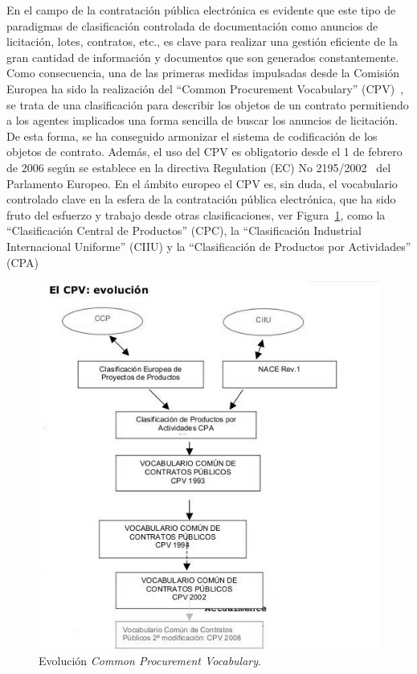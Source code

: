 En el campo de la contratación pública electrónica es evidente que este tipo
de paradigmas de clasificación controlada de documentación como anuncios de licitación, lotes,
contratos, etc., es clave para realizar una gestión eficiente de la gran cantidad de información
y documentos que son generados constantemente. Como consecuencia, una de las primeras medidas
impulsadas desde la Comisión Europea ha sido la realización del ``Common Procurement Vocabulary'' (\gls{CPV})~\cite{cpvguide}, se trata de 
una clasificación para describir los objetos de un contrato permitiendo a los agentes
implicados una forma sencilla de buscar los anuncios de licitación. De esta forma, se ha
conseguido armonizar el sistema de codificación de los objetos de contrato. Además, el uso
del CPV es obligatorio desde el 1 de febrero de 2006 según se establece en la directiva 
Regulation (EC) No 2195/2002~\cite{r2195} del Parlamento Europeo. En el ámbito europeo el CPV es, sin duda, 
el vocabulario controlado clave en la esfera de la contratación pública electrónica, que
ha sido fruto del esfuerzo y trabajo desde otras clasificaciones, ver Figura~\ref{fig:evo-cpv}, como la ``Clasificación
Central de Productos'' (\gls{CPC}), la ``Clasificación Industrial Internacional Uniforme'' (\gls{CIIU})
y la ``Clasificación de Productos por Actividades'' (\gls{CPA})

\begin{figure}[!htb]
\centering
	\includegraphics[width=14cm]{images/phd/eproc/evo-cpv}
\caption{Evolución \textit{Common Procurement Vocabulary}.}
\label{fig:evo-cpv}
\end{figure}

